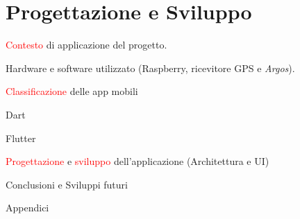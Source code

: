 \documentclass[12pt,italian,oneside]{report}
\newcommand{\rosso}[1]{\textcolor{red}{#1}}
\begin{document}
\maketitle

\raggedright




\section{Progettazione e Sviluppo}

\begin{firstheadlineitemize}

\item \rosso{Contesto} di applicazione del progetto.

\item Hardware e software utilizzato (Raspberry, ricevitore GPS e \textit{Argos}).

\item \rosso{Classificazione} delle app mobili

\item Dart

\item Flutter

\item \rosso{Progettazione} e \rosso{sviluppo} dell'applicazione (Architettura e UI)

\item Conclusioni e Sviluppi futuri

\item Appendici

\end{firstheadlineitemize}


\end{document}
